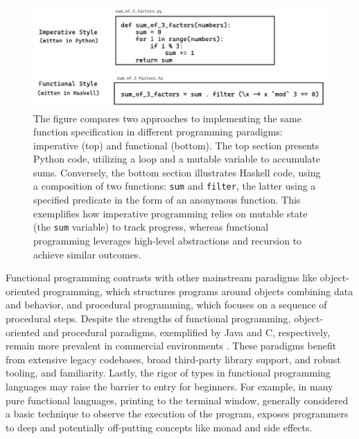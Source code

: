 \begin{figure}[]
  \includegraphics[width=\linewidth]{ImperativeFunctional}
  \caption[Comparing two approaches to implementing the same function specification in different programming paradigms: imperative and functional]{
    \label{fig:imperative-vs-functional}
    The figure compares two approaches to implementing the same function specification in different programming paradigms: imperative (top) and functional (bottom). The top section presents Python code, utilizing a loop and a mutable variable to accumulate sums. Conversely, the bottom section illustrates Haskell code, using a composition of two functions: \texttt{sum} and \texttt{filter}, the latter using a specified predicate in the form of an anonymous function. This exemplifies how imperative programming relies on mutable state (the \texttt{sum} variable) to track progress, whereas functional programming leverages high-level abstractions and recursion to achieve similar outcomes.    
    }
\end{figure}


Functional programming contrasts with other mainstream paradigms like object-oriented programming, which structures programs around objects combining data and behavior, and procedural programming, which focuses on a sequence of procedural steps. Despite the strengths of functional programming, object-oriented and procedural paradigms, exemplified by Java and C, respectively, remain more prevalent in commercial environments \cite{StackOverflow2023-cp, Cass2023-fa}. These paradigms benefit from extensive legacy codebases, broad third-party library support, and robust tooling, and familiarity. Lastly, the rigor of types in functional programming languages may raise the barrier to entry for beginners. For example, in many pure functional languages, printing to the terminal window, generally considered a basic technique to observe the execution of the program, exposes programmers to deep and potentially off-putting concepts like monad and side effects.  


